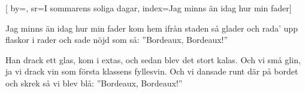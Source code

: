 


[ 		%
	by={},					%
	sr={I sommarens soliga dagar},					%
	index={Jag minns än idag hur min fader}]						%
	
\beginverse*						%
Jag minns än idag hur min fader 
kom hem ifrån staden så glader
och rada' upp flaskor i rader 
och sade nöjd som så: ''Bordeaux, Bordeaux!''
\endverse							%

\beginchorus						%
Han drack ett glas, kom i extas, 
och sedan blev det stort kalas. 
Och vi små glin, ja vi drack vin
som första klassens fyllesvin.
Och vi dansade runt där på bordet
och skrek så vi blev blå:
''Bordeaux, Bordeaux!''
\endchorus							%

\endsong							%